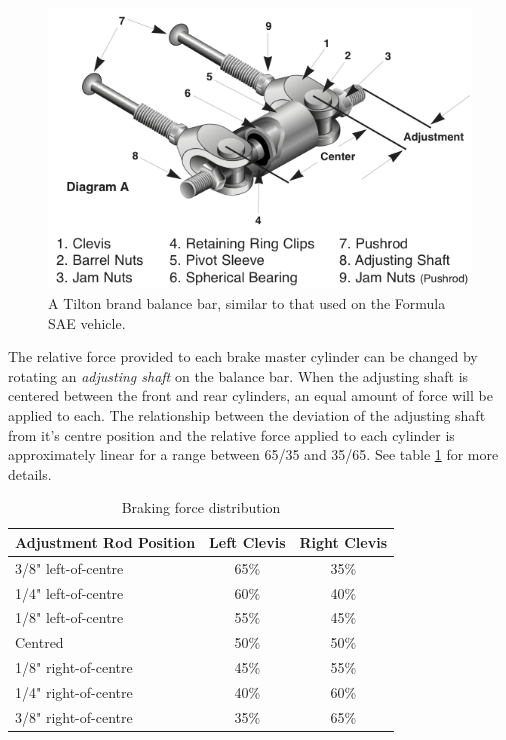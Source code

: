 \begin{figure}[h!]
	\centering
	 	\includegraphics[scale=1.0]{figures/balance_bar_diag.png}
    \caption{A Tilton brand balance bar, similar to that used on the Formula SAE vehicle.}
    \label{fig:balance_bar_diag}
\end{figure}

The relative force provided to each brake master cylinder can be changed by rotating an 
\emph{adjusting shaft} on the balance bar. When the adjusting shaft is centered between 
the front and rear cylinders, an equal amount of force will be applied to each. The relationship 
between the deviation of the adjusting shaft from it's centre position and the relative force 
applied to each cylinder is approximately linear for a range between 65/35 and 35/65. See table 
\ref{table:bb_force_distribution} for more details.

\begin{table}[H]
	\centering
	\caption{Braking force distribution}
	\label{table:bb_force_distribution}	
	\begin{tabular}{| l | c | c |}
		\hline Adjustment Rod Position & Left Clevis & Right Clevis  \\ \hline
		\hline 3/8" left-of-centre & 65\% & 35\% \\ 
		\hline 1/4" left-of-centre & 60\% & 40\% \\
		\hline 1/8" left-of-centre & 55\% & 45\% \\
		\hline Centred & 50\% & 50\% \\
		\hline 1/8" right-of-centre & 45\% & 55\% \\
		\hline 1/4" right-of-centre & 40\% & 60\% \\
		\hline 3/8" right-of-centre & 35\% & 65\% \\
		\hline
	\end{tabular}
\end{table}


